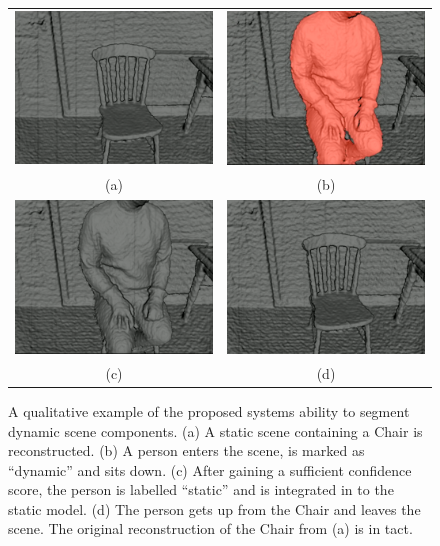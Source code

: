 \begin{figure}[ht]
  \label{fig:moseg_qualitative_chair}
  \centering
  \begin{tabular}{cc}
    \includegraphics[height=.25\linewidth]{figures/moseg/chair0.png} &
    \includegraphics[height=.25\linewidth]{figures/moseg/chair1.png} \\
    (a) & (b) \\
    \includegraphics[height=.25\linewidth]{figures/moseg/chair2.png} &
    \includegraphics[height=.25\linewidth]{figures/moseg/chair3.png} \\
    (c) & (d)
  \end{tabular}
  \caption[Motion Segmentation Qualitative Results II]
  {A qualitative example of the proposed systems ability to segment
    dynamic scene components.
    (a) A static scene containing a Chair is reconstructed.
    (b) A person enters the scene, is marked as ``dynamic'' and sits down.
    (c) After gaining a sufficient confidence score, the person is labelled
    ``static'' and is integrated in to the static model.
    (d) The person gets up from the Chair and leaves the scene. The original
    reconstruction of the Chair from (a) is in tact.}
\end{figure}

